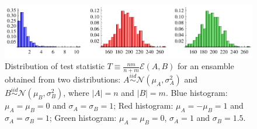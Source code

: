 \documentclass[simplex.tex]{subfiles}
\begin{document}
%
\begin{figure}[h!]
\begin{cframed}
\centering
\includegraphics[width=\textwidth]{../../figs/energy_hists.pdf}
\caption{
Distribution of test statistic 
$T\equiv\tfrac{n m }{n+m}\mathcal{E}(A,B)$ 
for an ensamble obtained from two distributions:
$A \stackrel{iid}{\sim} \mathcal{N}(\mu_A,\sigma_A^2)$ and
$B \stackrel{iid}{\sim} \mathcal{N}(\mu_B, \sigma_B^2)$, where
$|A|=n$ and $|B|=m$.
Blue histogram: $\mu_A = \mu_B = 0$ and $\sigma_A = \sigma_B = 1$;
Red histogram: $\mu_A = - \mu_B = 1$ and $\sigma_A = \sigma_B = 1$;
Green histogram: $\mu_A = \mu_B = 0$, $\sigma_A = 1$ and $\sigma_B = 1.5$.
}
\label{fig:nonpar}
\end{cframed}
\end{figure}
%
\end{document}
